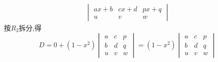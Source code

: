 \begin{questions}
\begin{solution}
\begin{align*}
\begin{vmatrix}
        ax+b & cx+d & px+q \\
        u & v & w 
        \end{vmatrix}
        \end{align*}
        按$R_2$拆分,得
        \[
        D= 0+(1-x^2) 
        \begin{vmatrix} 
        a & c & p \\ 
        b & d & q \\
        u & v & w 
        \end{vmatrix}
        = (1-x^2)
        \begin{vmatrix} 
        a & c & p \\ 
        b & d & q \\
        u & v & w 
        \end{vmatrix}
        \]
    \end{solution}


\end{questions}
